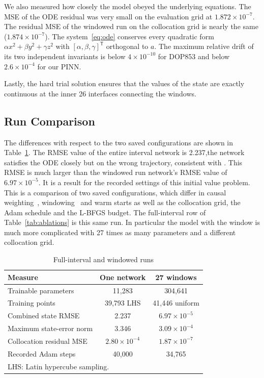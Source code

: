 \documentclass[conference,a4paper]{IEEEtran}
\begin{document}
We also measured how closely the model obeyed the underlying equations. The MSE of the ODE residual was very small on the evaluation grid at $1.872\times10^{-7}$. The residual MSE of the windowed run on the collocation grid is nearly the same ($1.874\times10^{-7}$). The system~\eqref{eq:ode} conserves every quadratic form $\alpha x^2+\beta y^2+\gamma z^2$ with $[\alpha,\beta,\gamma]^\mathsf{T}$ orthogonal to $a$. The maximum relative drift of its two independent invariants is below $4\times10^{-10}$ for DOP853 and below $2.6\times10^{-4}$ for our PINN.

Lastly, the hard trial solution ensures that the values of the state are exactly continuous at the inner 26 interfaces connecting the windows.


\subsection{Run Comparison}
The differences with respect to the two saved configurations are shown in Table~\ref{tab:comparison}. The RMSE value of the entire interval network is 2.237,the network satisfies the ODE closely but on the wrong trajectory, consistent with \cite{rohrhofer2023}. This RMSE is much larger than the windowed run network's RMSE value of $6.97\times10^{-5}$. It is a result for the recorded settings of this initial value problem. This is a comparison of two saved configurations, which differ in causal weighting~\cite{wang2024causal}, windowing~\cite{penwarden2023} and warm starts as well as the collocation grid, the Adam schedule and the L-BFGS budget. The full-interval row of Table~\ref{tab:ablations} is this same run. In particular the model with the window is much more complicated with 27 times as many parameters and a different collocation grid.

\begin{table}[t]
\caption{Full-interval and windowed runs}
\label{tab:comparison}
\centering\footnotesize
\begin{tabular}{lcc}
\toprule
Measure & One network & 27 windows\\
\midrule
Trainable parameters & 11,283 & 304,641\\
Training points & 39,793 LHS & 41,446 uniform\\
Combined state RMSE & 2.237 & $6.97\times10^{-5}$\\
Maximum state-error norm & 3.346 & $3.09\times10^{-4}$\\
Collocation residual MSE & $2.80\times10^{-4}$ & $1.87\times10^{-7}$\\
Recorded Adam steps & 40,000 & 34,765\\
\bottomrule
\multicolumn{3}{l}{LHS: Latin hypercube sampling.}\\
\end{tabular}
\end{table}
\end{document}
